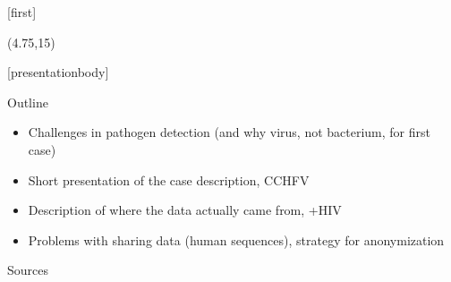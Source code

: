 \documentclass[aspectratio=169,t]{beamer}
\subtitle{The case in a few slides}
\begin{document}
[first]

\begin{frame}[noframenumbering]
    \titlepage
    \begin{textblock}{10}(4.75,15)
			\textcolor{white}{\cite{logo}}
    \end{textblock}
\end{frame}

[presentationbody] 

\begin{frame}{Outline}
	\begin{itemize}
		\item Challenges in pathogen detection (and why virus, not bacterium, for first case)
		\item Short presentation of the case description, CCHFV
		\item Description of where the data actually came from, +HIV
		\item Problems with sharing data (human sequences), strategy for anonymization
	\end{itemize}
\end{frame}

\begin{frame}[allowframebreaks]{Sources}
    \printbibliography
\end{frame}


\end{document}
